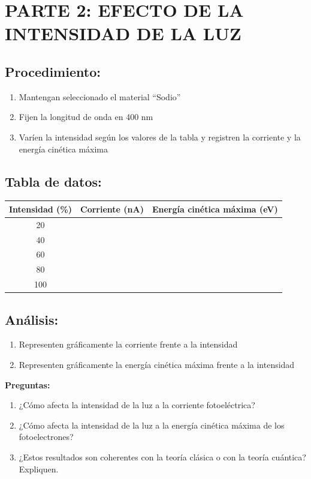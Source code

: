 \documentclass[12pt,a4paper]{article}
\begin{document}
	\newpage
	
	\section{PARTE 2: EFECTO DE LA INTENSIDAD DE LA LUZ}
	
	\subsection{Procedimiento:}
	\begin{enumerate}
		\item Mantengan seleccionado el material ``Sodio''
		\item Fijen la longitud de onda en 400 nm
		\item Varíen la intensidad según los valores de la tabla y registren la corriente y la energía cinética máxima
	\end{enumerate}
	
	\subsection{Tabla de datos:}
	
	\begin{center}
		\begin{tabular}{|c|c|c|}
			\hline
			\textbf{Intensidad (\%)} & \textbf{Corriente (nA)} & \textbf{Energía cinética máxima (eV)} \\
			\hline
			20 & & \\
			\hline
			40 & & \\
			\hline
			60 & & \\
			\hline
			80 & & \\
			\hline
			100 & & \\
			\hline
		\end{tabular}
	\end{center}
	
	\subsection{Análisis:}
	\begin{enumerate}
		\item Representen gráficamente la corriente frente a la intensidad
		\item Representen gráficamente la energía cinética máxima frente a la intensidad
	\end{enumerate}
	
	\begin{preguntabox}
		\textbf{Preguntas:}
		\begin{enumerate}
			\item ¿Cómo afecta la intensidad de la luz a la corriente fotoeléctrica?
			\item ¿Cómo afecta la intensidad de la luz a la energía cinética máxima de los fotoelectrones?
			\item ¿Estos resultados son coherentes con la teoría clásica o con la teoría cuántica? Expliquen.
		\end{enumerate}
	\end{preguntabox}
	
\end{document}
